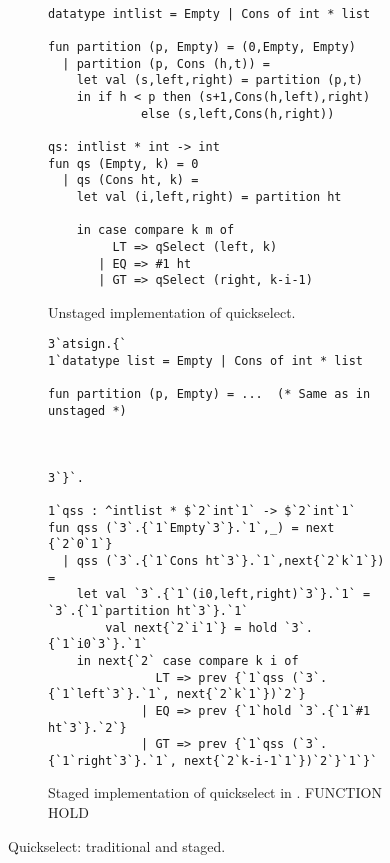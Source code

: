 
\begin{figure*}
\begin{subfigure}[t]{0.45\textwidth}
\begin{lstlisting} 

datatype intlist = Empty | Cons of int * list

fun partition (p, Empty) = (0,Empty, Empty) 
  | partition (p, Cons (h,t)) = 
    let val (s,left,right) = partition (p,t) 
    in if h < p then (s+1,Cons(h,left),right) 
             else (s,left,Cons(h,right))

qs: intlist * int -> int
fun qs (Empty, k) = 0
  | qs (Cons ht, k) =
    let val (i,left,right) = partition ht

    in case compare k m of
         LT => qSelect (left, k)
       | EQ => #1 ht
       | GT => qSelect (right, k-i-1)
\end{lstlisting}
\caption{Unstaged implementation of quickselect.}
\label{fig:qs-unstaged}
\end{subfigure}
\hfill
\begin{subfigure}[t]{0.55\textwidth}
\begin{lstlisting} 
3`atsign.{`  
1`datatype list = Empty | Cons of int * list

fun partition (p, Empty) = ...  (* Same as in unstaged *)



3`}`.

1`qss : ^intlist * $`2`int`1` -> $`2`int`1`
fun qss (`3`.{`1`Empty`3`}.`1`,_) = next {`2`0`1`}
  | qss (`3`.{`1`Cons ht`3`}.`1`,next{`2`k`1`}) = 
    let val `3`.{`1`(i0,left,right)`3`}.`1` = `3`.{`1`partition ht`3`}.`1`
        val next{`2`i`1`} = hold `3`.{`1`i0`3`}.`1`
    in next{`2` case compare k i of
               LT => prev {`1`qss (`3`.{`1`left`3`}.`1`, next{`2`k`1`})`2`}
             | EQ => prev {`1`hold `3`.{`1`#1 ht`3`}.`2`}
             | GT => prev {`1`qss (`3`.{`1`right`3`}.`1`, next{`2`k-i-1`1`})`2`}`1`}`
\end{lstlisting}
\caption{Staged implementation of quickselect in \lang. FUNCTION HOLD}

\label{fig:qs-staged}
\end{subfigure}
\caption{Quickselect: traditional and staged.}
\end{figure*}

